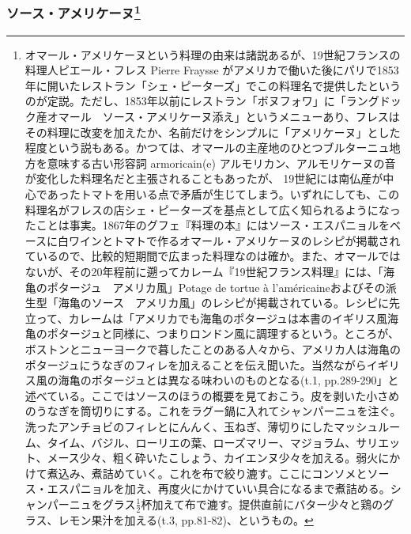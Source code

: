 \begin{recette}
{\subsubsection[ソース・アメリケーヌ]{\texorpdfstring{ソース・アメリケーヌ\footnote{オマール・アメリケーヌという料理の由来は諸説あるが、19世紀フランスの料理人ピエール・フレス
  Pierre Fraysse
  がアメリカで働いた後にパリで1853年に開いたレストラン「シェ・ピーターズ」でこの料理名で提供したというのが定説。ただし、1853年以前にレストラン「ボヌフォワ」に「ラングドック産オマール　ソース・アメリケーヌ添え」というメニューあり、フレスはその料理に改変を加えたか、名前だけをシンプルに「アメリケーヌ」とした程度という説もある。かつては、オマールの主産地のひとつブルターニュ地方を意味する古い形容詞
  armoricain(e)
  アルモリカン、アルモリケーヌの音が変化した料理名だと主張されることもあったが、
  19世紀には南仏産が中心であったトマトを用いる点で矛盾が生じてしまう。いずれにしても、この料理名がフレスの店シェ・ピーターズを基点として広く知られるようになったことは事実。1867年のグフェ『料理の本』にはソース・エスパニョルをベースに白ワインとトマトで作るオマール・アメリケーヌのレシピが掲載されているので、比較的短期間で広まった料理なのは確か。また、オマールではないが、その20年程前に遡ってカレーム『19世紀フランス料理』には、「海亀のポタージュ　アメリカ風」Potage
  de tortue à
  l'américaineおよびその派生型「海亀のソース　アメリカ風」のレシピが掲載されている。レシピに先立って、カレームは「アメリカでも海亀のポタージュは本書のイギリス風海亀のポタージュと同様に、つまりロンドン風に調理するという。ところが、ボストンとニューヨークで暮したことのある人々から、アメリカ人は海亀のポタージュにうなぎのフィレを加えることを伝え聞いた。当然ながらイギリス風の海亀のポタージュとは異なる味わいのものとなる(t.1,
  pp.289-290」と述べている。ここではソースのほうの概要を見ておこう。皮を剥いた小さめのうなぎを筒切りにする。これをラグー鍋に入れてシャンパーニュを注ぐ。洗ったアンチョビのフィレとにんんく、玉ねぎ、薄切りにしたマッシュルーム、タイム、バジル、ローリエの葉、ローズマリー、マジョラム、サリエット、メース少々、粗く砕いたこしょう、カイエンヌ少々を加える。弱火にかけて煮込み、煮詰めていく。これを布で絞り漉す。ここにコンソメとソース・エスパニョルを加え、再度火にかけていい具合になるまで煮詰める。シャンパーニュをグラス\(\frac{1}{2}\)杯加えて布で漉す。提供直前にバター少々と鶏のグラス、レモン果汁を加える(t.3,
  pp.81-82)、というもの。}}{ソース・アメリケーヌ}}\label{sauce-americaine}}




\end{recette}
